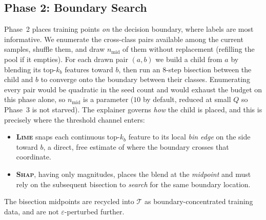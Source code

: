 \documentclass[sigconf,anonymous,review]{acmart}
\begin{document}
\subsection{Phase 2: Boundary Search}
\label{subsec:boundary}
Phase~2 places training points \emph{on} the decision boundary, where labels are most
informative. We enumerate the cross-class pairs available among the current samples, shuffle them,
and draw $n_{\text{mid}}$ of them without replacement (refilling the pool if it empties). For each
drawn pair $(a,b)$ we build a child from $a$ by blending its top-$k_b$ features toward $b$, then run
an $8$-step bisection between the child and $b$ to converge onto the boundary between their classes.
Enumerating every pair would be quadratic in the seed count and would exhaust the budget on this
phase alone, so $n_{\text{mid}}$ is a parameter ($10$ by default, reduced at small $Q$ so Phase~3 is
not starved). The explainer governs \emph{how} the
child is placed, and this is precisely where the threshold channel enters:
\begin{itemize}
  \item \textbf{\textsc{Lime}} snaps each continuous top-$k_b$ feature to its local
  \emph{bin edge} on the side toward $b$, a direct, free estimate of where the boundary
  crosses that coordinate.
  \item \textbf{\textsc{Shap}}, having only magnitudes, places the blend at the
  \emph{midpoint} and must rely on the subsequent bisection to \emph{search} for the
  same boundary location.
\end{itemize}
The bisection midpoints are recycled into $\mathcal{T}$ as boundary-concentrated training data,
and are not $\varepsilon$-perturbed further.
\end{document}
